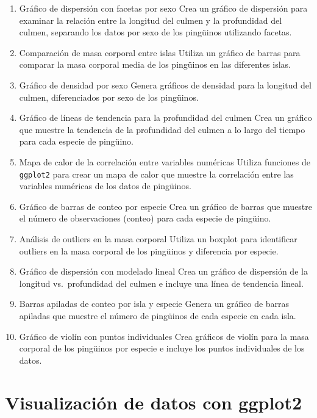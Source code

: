 \documentclass[
]{book}
\begin{document}
\begin{enumerate}
\def\labelenumi{\arabic{enumi}.}
\item
  Gráfico de dispersión con facetas por sexo
  Crea un gráfico de dispersión para examinar la relación entre la longitud del culmen y la profundidad del culmen, separando los datos por sexo de los pingüinos utilizando facetas.
\item
  Comparación de masa corporal entre islas
  Utiliza un gráfico de barras para comparar la masa corporal media de los pingüinos en las diferentes islas.
\item
  Gráfico de densidad por sexo
  Genera gráficos de densidad para la longitud del culmen, diferenciados por sexo de los pingüinos.
\item
  Gráfico de líneas de tendencia para la profundidad del culmen
  Crea un gráfico que muestre la tendencia de la profundidad del culmen a lo largo del tiempo para cada especie de pingüino.
\item
  Mapa de calor de la correlación entre variables numéricas
  Utiliza funciones de \texttt{ggplot2} para crear un mapa de calor que muestre la correlación entre las variables numéricas de los datos de pingüinos.
\item
  Gráfico de barras de conteo por especie
  Crea un gráfico de barras que muestre el número de observaciones (conteo) para cada especie de pingüino.
\item
  Análisis de outliers en la masa corporal
  Utiliza un boxplot para identificar outliers en la masa corporal de los pingüinos y diferencia por especie.
\item
  Gráfico de dispersión con modelado lineal
  Crea un gráfico de dispersión de la longitud vs.~profundidad del culmen e incluye una línea de tendencia lineal.
\item
  Barras apiladas de conteo por isla y especie
  Genera un gráfico de barras apiladas que muestre el número de pingüinos de cada especie en cada isla.
\item
  Gráfico de violín con puntos individuales
  Crea gráficos de violín para la masa corporal de los pingüinos por especie e incluye los puntos individuales de los datos.
\end{enumerate}

\hypertarget{visualizaciuxf3n-de-datos-con-ggplot2-1}{%
\chapter{Visualización de datos con ggplot2}\label{visualizaciuxf3n-de-datos-con-ggplot2-1}}
\end{document}
